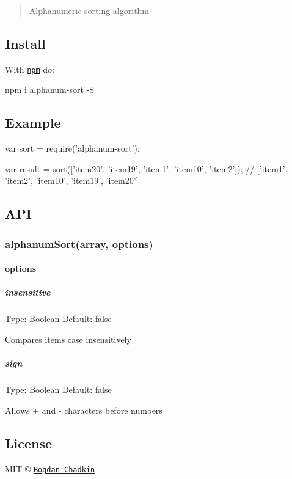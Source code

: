 \href{https://travis-ci.org/TrySound/alphanum-sort}{\tt }

\begin{quote}
Alphanumeric sorting algorithm \end{quote}


\subsection*{Install}

With \href{https://npmjs.org/package/alphanum-sort}{\tt npm} do\+:


\begin{DoxyCode}
npm i alphanum-sort -S
\end{DoxyCode}


\subsection*{Example}


\begin{DoxyCode}
var sort = require('alphanum-sort');

var result = sort(['item20', 'item19', 'item1', 'item10', 'item2']);
// ['item1', 'item2', 'item10', 'item19', 'item20']
\end{DoxyCode}


\subsection*{A\+PI}

\subsubsection*{alphanum\+Sort(array, options)}

\paragraph*{options}

\subparagraph*{insensitive}

Type\+: {\ttfamily Boolean} Default\+: {\ttfamily false}

Compares items case insensitively

\subparagraph*{sign}

Type\+: {\ttfamily Boolean} Default\+: {\ttfamily false}

Allows {\ttfamily +} and {\ttfamily -\/} characters before numbers

\subsection*{License}

M\+IT © \href{https://github.com/trysound}{\tt Bogdan Chadkin} 
